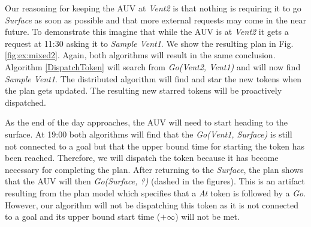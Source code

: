 Our reasoning for keeping the AUV at {\em Vent2} is that
nothing is requiring it to go {\em Surface} as soon as possible and that
more external requests may come in the near future. To demonstrate
this imagine that while the AUV is at {\em Vent2} it gets a
request at 11:30 asking it to {\em Sample Vent1}.  We show the resulting plan in
Fig. \ref{fig:ex:mixed2}. Again, both algorithms will result in the
same conclusion. Algorithm \ref{DispatchToken} will search from {\em
Go(Vent2, Vent1)} and will now find {\em Sample Vent1}. The
distributed algorithm will find and star the new tokens when the plan
gets updated. The resulting new starred tokens will be proactively
dispatched.

As the end of the day approaches, the AUV will need to start heading
to the surface. At 19:00 both algorithms will find that the {\em Go(Vent1,
Surface)} is still not connected to a goal but that the upper bound time
for starting the token has been reached. Therefore, we will dispatch
the token because it has become necessary for completing the plan.
After returning to the {\em Surface}, the plan shows that the AUV will then {\em
Go(Surface, ?)} (dashed in the figures). This is an artifact resulting
from the plan model which specifies that a {\em At} token is followed by a {\em Go}. 
However, our algorithm will not be dispatching this token as 
it is not connected to a goal and its upper bound start time
($+\infty$) will not be met.



